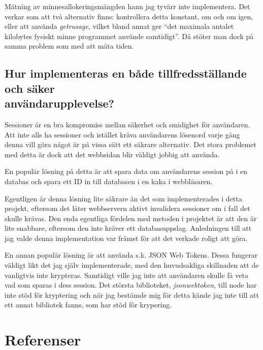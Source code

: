 \documentclass{article}
\begin{document}
Mätning av minnesallokeringsmängden hann jag tyvärr inte implementera. Det
verkar som att två alternativ finns: kontrollera detta konstant, om och om igen,
eller att använda \textit{getrusage}, vilket bland annat ger ``det maximala
antalet kilobytes fysiskt minne programmet använde samtidigt''. Då stöter man
dock på samma problem som med att mäta tiden.

\subsection{Hur implementeras en både tillfredsställande och säker \\
	användarupplevelse?}

Sessioner är en bra kompromiss mellan säkerhet och smidighet för användaren. Att
inte alls ha sessioner och istället kräva användarens lösenord varje gång denna
vill göra något är på vissa sätt ett säkrare alternativ. Det stora problemet med
detta är dock att det webbsidan blir väldigt jobbig att använda.

En populär lösning på detta är att spara data om användarens session på i en
databas och spara ett ID in till databasen i en kaka i webbläsaren.

Egentligen är denna lösning lite säkrare än det som implementerades i detta
projekt, eftersom det låter webbservern aktivt invalidera sessioner om i fall
det skulle krävas. Den enda egentliga fördelen med metoden i projektet är att
den är lite snabbare, eftersom den inte kräver ett databasuppslag. Anledningen
till att jag valde denna implementation var främst för att det verkade roligt
att göra.

En annan populär lösning är att använda s.k. JSON Web Tokens. Dessa fungerar
väldigt likt det jag själv implementerade, med den huvudsakliga skillnaden att
de vanligtvis inte krypteras. Samtidigt ville jag inte att användaren skulle få
veta vad som sparas i dess session. Det största biblioteket,
\textit{jsonwebtoken}, till node har inte stöd för kryptering och när jag
bestämde mig för detta kände jag inte till att ett annat bibliotek fanns, som
har stöd för krypering.

\section{Referenser}
\end{document}
